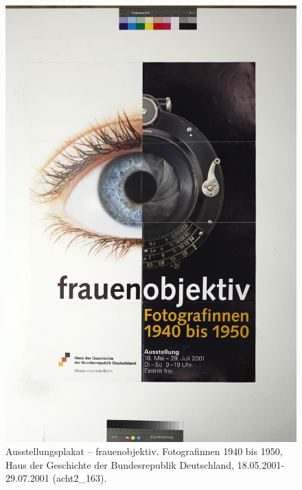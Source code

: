 \documentclass[a4paper,12pt,ngerman]{article}
\begin{document}
\newpage
\begin{figure}[ht]
\includegraphics[width=\linewidth]{Abbildung_47_(acht2_163)}
\centering
\caption{Ausstellungsplakat -- frauenobjektiv. Fotografinnen 1940 bis 1950, Haus der Geschichte der Bundesrepublik Deutschland, 18.05.2001-29.07.2001 (acht2\_163).}
\end{figure}
\end{document}
